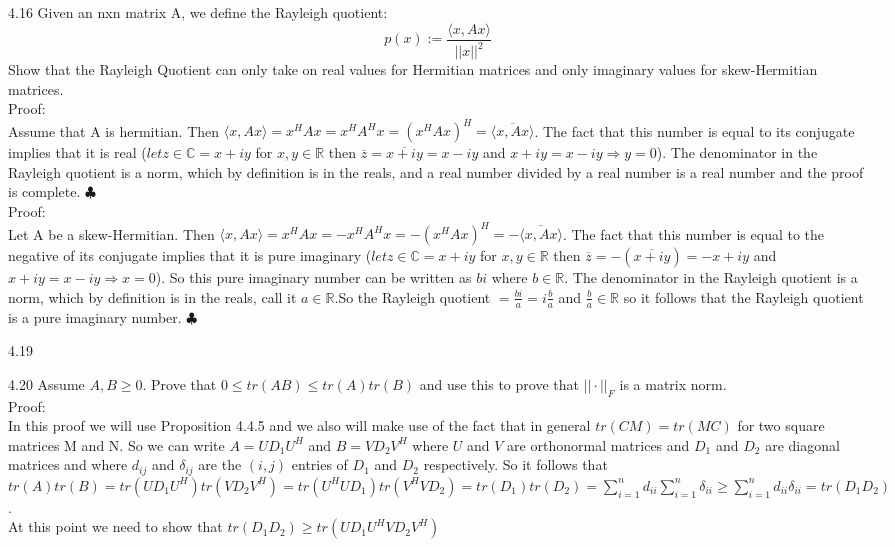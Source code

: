 \documentclass[12pt]{article}
\newenvironment{problems}{\begin{list}{}{\setlength{\labelwidth}{.7in}}}{\end{list}}
\begin{document}
\begin{problems}
\item[4.16]
Given an nxn matrix A, we define the Rayleigh quotient:\\
\[p(x) := \frac{\langle x, Ax \rangle}{||x||^2}\]
Show that the Rayleigh Quotient can only take on real values for Hermitian matrices and only imaginary values for skew-Hermitian matrices.\\
Proof:\\
Assume that A is hermitian. Then $\langle x, Ax\rangle = x^HAx = x^HA^Hx = (x^HAx)^H  = \overline{\langle x,Ax\rangle}$. The fact that this number is equal to its conjugate implies that it is real ($ let z\in\mathbb{C} = x+iy $ for $x,y\in\mathbb{R}$ then $\overline z = \overline{x+iy} = x-iy$ and $x+iy = x-iy \Rightarrow y = 0$). The denominator in the Rayleigh quotient is a norm, which by definition is in the reals, and a real number divided by a real number is a real number and the proof is complete. \hfill $\clubsuit$\\

Proof:\\
Let A be a skew-Hermitian. Then $\langle x, Ax\rangle = x^HAx = -x^HA^Hx = -(x^HAx)^H  = -\overline{\langle x,Ax\rangle}$. The fact that this number is equal to the negative of its conjugate implies that it is pure imaginary ($ let z\in\mathbb{C} = x+iy $ for $x,y\in\mathbb{R}$ then $\overline z = -(\overline{x+iy}) = -x +iy$ and $x+iy = x-iy \Rightarrow x = 0$). So this pure imaginary number can be written as $bi$ where $b\in \mathbb{R}$. The denominator in the Rayleigh quotient is a norm, which by definition is in the reals, call it $a\in\mathbb{R}$.So the Rayleigh quotient $=\frac{bi}{a} = i\frac{b}{a}$ and $\frac{b}{a}\in \mathbb{R}$ so it follows that the Rayleigh quotient is a pure imaginary number. \hfill $\clubsuit$\\

\item[4.19]

\item[4.20]
Assume $A,B\geq 0$. Prove that $0\leq tr(AB) \leq tr(A)tr(B)$ and use this to prove that $||\cdot||_F$ is a matrix norm.\\
Proof:\\
In this proof we will use Proposition 4.4.5 and we also will make use of the fact that in general $tr(CM) = tr(MC)$ for two square matrices M and N. So we can write $A = UD_1U^H$ and $B=VD_2V^H$ where $U$ and $V$ are orthonormal matrices and $D_1$ and $D_2$ are diagonal matrices and where $d_{ij}$ and $\delta_{ij}$ are the $(i,j)$ entries of $D_1$ and $D_2$ respectively. So it follows that $tr(A)tr(B) = tr(UD_1U^H)tr(VD_2V^H) = tr(U^HUD_1)tr(V^HVD_2) = tr(D_1)tr(D_2) = \sum\limits_{i=1}^n d_{ii}\sum\limits_{i=1}^n \delta_{ii} \geq \sum\limits_{i=1}^{n}d_{ii}\delta_{ii} = tr(D_1D_2)$.\\
At this point we need to show that $tr(D_1D_2)\geq tr(UD_1U^HVD_2V^H)$\\


\end{problems}
\end{document}
